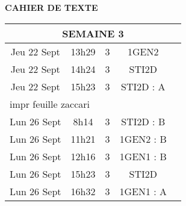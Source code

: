\documentclass[10pt]{article}
\newcommand{\mypage}[1]{ 
		\begin{minipage}[c]{0.45\textwidth}
			\vspace{5pt}
			{#1}
			\vspace{5pt}
		\end{minipage}
}
\newcommand{\seancea}{	\mypage{}}
\newcommand{\seanceb}{	\mypage{}}
\newcommand{\seancec}{	\mypage{}}
\newcommand{\seanced}{	\mypage{}}
\newcommand{\seancee}{	\mypage{}}
\newcommand{\seancef}{	\mypage{}}
\newcommand{\seanceg}{	\mypage{}}
\newcommand{\seanceh}{	\mypage{}}
\begin{document}
\begin{center}
	\textbf{CAHIER DE TEXTE}
\end{center}

\setlength{\tabcolsep}{13pt}
\renewcommand{\arraystretch}{2.5}
\begin{longtable}{@{}|c|c|c|c|c|@{}} \toprule
	\midrule\multicolumn{5}{||c||}{SEMAINE 3}      \\\midrule\midrule
	Jeu 22 Sept & 13h29 & 3 & 1GEN2     & \seancea \\\midrule
	Jeu 22 Sept & 14h24 & 3 & STI2D     & \seanceb \\\midrule
	Jeu 22 Sept & 15h23 & 3 & STI2D : A & \seancec \\\midrule\midrule
	\multicolumn{5}{|l|}{impr feuille zaccari}     \\\midrule
	Lun 26 Sept & 8h14  & 3 & STI2D : B & \seanced \\\midrule
	Lun 26 Sept & 11h21 & 3 & 1GEN2 : B & \seancee \\\midrule
	Lun 26 Sept & 12h16 & 3 & 1GEN1 : B & \seancef \\\midrule
	Lun 26 Sept & 15h23 & 3 & STI2D     & \seanceg \\\midrule
	Lun 26 Sept & 16h32 & 3 & 1GEN1 : A & \seanceh \\\midrule


	\bottomrule
\end{longtable}
\end{document}
